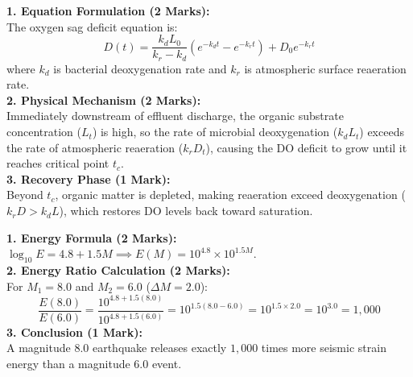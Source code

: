 \begin{solutionbox}
\textbf{1. Equation Formulation (2 Marks):}\\
The oxygen sag deficit equation is:
\[
D(t) = \frac{k_d L_0}{k_r - k_d} \left( e^{-k_d t} - e^{-k_r t} \right) + D_0 e^{-k_r t}
\]
where $k_d$ is bacterial deoxygenation rate and $k_r$ is atmospheric surface reaeration rate.\\
\textbf{2. Physical Mechanism (2 Marks):}\\
Immediately downstream of effluent discharge, the organic substrate concentration ($L_t$) is high, so the rate of microbial deoxygenation ($k_d L_t$) exceeds the rate of atmospheric reaeration ($k_r D_t$), causing the DO deficit to grow until it reaches critical point $t_c$.\\
\textbf{3. Recovery Phase (1 Mark):}\\
Beyond $t_c$, organic matter is depleted, making reaeration exceed deoxygenation ($k_r D > k_d L$), which restores DO levels back toward saturation.
\end{solutionbox}

\begin{solutionbox}
\textbf{1. Energy Formula (2 Marks):}\\
$\log_{10} E = 4.8 + 1.5 M \implies E(M) = 10^{4.8} \times 10^{1.5 M}$.\\
\textbf{2. Energy Ratio Calculation (2 Marks):}\\
For $M_1 = 8.0$ and $M_2 = 6.0$ ($\Delta M = 2.0$):
\[
\frac{E(8.0)}{E(6.0)} = \frac{10^{4.8 + 1.5(8.0)}}{10^{4.8 + 1.5(6.0)}} = 10^{1.5(8.0 - 6.0)} = 10^{1.5 \times 2.0} = 10^{3.0} = 1{,}000
\]
\textbf{3. Conclusion (1 Mark):}\\
A magnitude $8.0$ earthquake releases exactly $1{,}000$ times more seismic strain energy than a magnitude $6.0$ event.
\end{solutionbox}
\newpage
